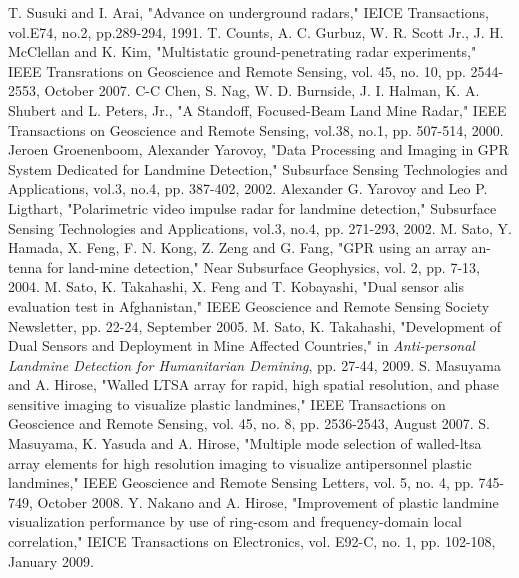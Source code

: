 ﻿\documentclass[12pt,oneside]{jsbook}
\begin{document}
%
\begin{thebibliography}{99}%
 T. Susuki and I. Arai, "Advance on underground radars," IEICE
Transactions, vol.E74, no.2, pp.289-294, 1991.
 T. Counts, A. C. Gurbuz, W. R. Scott Jr.,
        J. H. McClellan and K. Kim, "Multistatic
ground-penetrating radar experiments," IEEE Transrations on Geoscience and
Remote Sensing, vol. 45, no. 10, pp. 2544-2553, October 2007.
 C-C Chen, S. Nag, W. D. Burnside, J. I. Halman,
K. A. Shubert and L. Peters, Jr., "A Standoff, Focused-Beam Land Mine Radar,"
IEEE Transactions on Geoscience and Remote Sensing, vol.38, no.1, pp. 507-514, 2000.
 Jeroen Groenenboom, Alexander Yarovoy,
"Data Processing and Imaging in GPR System Dedicated for Landmine
Detection," Subsurface Sensing Technologies and Applications, vol.3,
        no.4, pp. 387-402, 2002.
 Alexander G. Yarovoy and  Leo P. Ligthart,
"Polarimetric video impulse radar for landmine detection,"
Subsurface Sensing Technologies and Applications, vol.3, no.4, pp. 271-293, 2002.
 M. Sato, Y. Hamada, X. Feng, F. N. Kong, Z. Zeng and
        G. Fang, "GPR using an array an-
tenna for land-mine detection," Near Subsurface Geophysics, vol. 2,
        pp. 7-13, 2004.
  M. Sato, K. Takahashi, X. Feng and
        T. Kobayashi, "Dual sensor alis evaluation test in
        Afghanistan," IEEE Geoscience and Remote Sensing Society
        Newsletter, pp. 22-24, September 2005.
  M. Sato, K. Takahashi, "Development of
        Dual Sensors and Deployment in Mine Affected
        Countries," in {\it Anti-personal Landmine Detection for
        Humanitarian Demining}, pp. 27-44, 2009.
 S. Masuyama and A. Hirose, "Walled LTSA array for rapid, high spatial resolution,
and phase sensitive imaging to visualize plastic landmines," IEEE Transactions
on Geoscience and Remote Sensing, vol. 45, no. 8, pp. 2536-2543, August 2007.
 S. Masuyama, K. Yasuda and A. Hirose, "Multiple mode selection of
walled-ltsa array elements for high resolution imaging to visualize antipersonnel
plastic landmines," IEEE Geoscience and Remote Sensing Letters, vol. 5,
        no. 4, pp. 745-749, October 2008.
 Y. Nakano and A. Hirose, "Improvement of plastic
        landmine visualization performance by use of ring-csom and
        frequency-domain local correlation," IEICE Transactions on
        Electronics, vol. E92-C, no. 1, pp. 102-108, January 2009.

\end{thebibliography}
\end{document}
